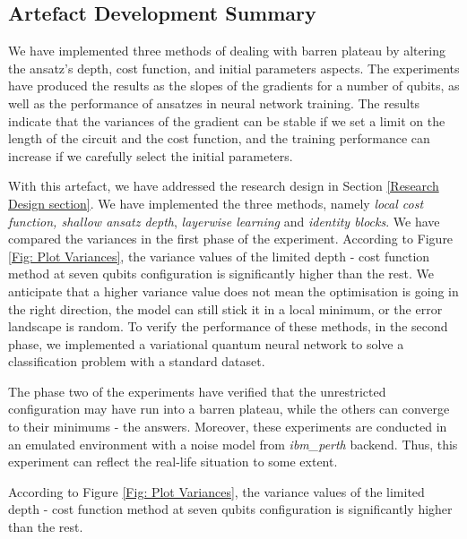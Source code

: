 \subsection{Artefact Development Summary}

We have implemented three methods of dealing with barren plateau by altering the ansatz's depth, cost function, and initial parameters aspects.
The experiments have produced the results as the slopes of the gradients for a number of qubits, as well as the performance of ansatzes in neural network training.
The results indicate that the variances of the gradient can be stable if we set a limit on the length of the circuit and the cost function, and the training performance can increase if we carefully select the initial parameters.

With this artefact, we have addressed the research design in Section \ref{Research Design section}.
We have implemented the three methods, namely \textit{local cost function, shallow ansatz depth}, \textit{layerwise learning} and \textit{identity blocks}.
We have compared the variances in the first phase of the experiment.
According to Figure \ref{Fig: Plot Variances}, the variance values of the limited depth - cost function method at seven qubits configuration is significantly higher than the rest.
We anticipate that a higher variance value does not mean the optimisation is going in the right direction, the model can still stick it in a local minimum, or the error landscape is random.
To verify the performance of these methods, in the second phase, we implemented a variational quantum neural network to solve a classification problem with a standard dataset.

The phase two of the experiments have verified that the unrestricted configuration may have run into a barren plateau, while the others can converge to their minimums - the answers.
Moreover, these experiments are conducted in an emulated environment with a noise model from \emph{ibm\_perth} backend.
Thus, this experiment can reflect the real-life situation to some extent.

According to Figure \ref{Fig: Plot Variances}, the variance values of the limited depth - cost function method at seven qubits configuration is significantly higher than the rest.
